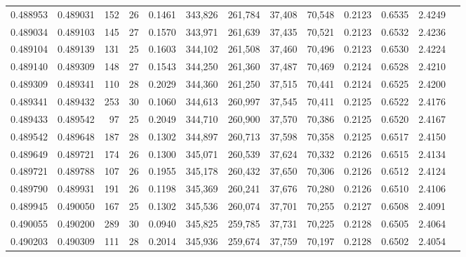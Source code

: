 \begin{tabular}{rrrrrrrrrrrrr}
0.488953 & 0.489031 & 152 &  26 &                                     0.1461 & 343,826 & 261,784 &  37,408 &  70,548 & 0.2123 & 0.6535 & 2.4249 \\
0.489034 & 0.489103 & 145 &  27 &                                     0.1570 & 343,971 & 261,639 &  37,435 &  70,521 & 0.2123 & 0.6532 & 2.4236 \\
0.489104 & 0.489139 & 131 &  25 &                                     0.1603 & 344,102 & 261,508 &  37,460 &  70,496 & 0.2123 & 0.6530 & 2.4224 \\
0.489140 & 0.489309 & 148 &  27 &                                     0.1543 & 344,250 & 261,360 &  37,487 &  70,469 & 0.2124 & 0.6528 & 2.4210 \\
0.489309 & 0.489341 & 110 &  28 &                                     0.2029 & 344,360 & 261,250 &  37,515 &  70,441 & 0.2124 & 0.6525 & 2.4200 \\
0.489341 & 0.489432 & 253 &  30 &                                     0.1060 & 344,613 & 260,997 &  37,545 &  70,411 & 0.2125 & 0.6522 & 2.4176 \\
0.489433 & 0.489542 &  97 &  25 &                                     0.2049 & 344,710 & 260,900 &  37,570 &  70,386 & 0.2125 & 0.6520 & 2.4167 \\
0.489542 & 0.489648 & 187 &  28 &                                     0.1302 & 344,897 & 260,713 &  37,598 &  70,358 & 0.2125 & 0.6517 & 2.4150 \\
0.489649 & 0.489721 & 174 &  26 &                                     0.1300 & 345,071 & 260,539 &  37,624 &  70,332 & 0.2126 & 0.6515 & 2.4134 \\
0.489721 & 0.489788 & 107 &  26 &                                     0.1955 & 345,178 & 260,432 &  37,650 &  70,306 & 0.2126 & 0.6512 & 2.4124 \\
0.489790 & 0.489931 & 191 &  26 &                                     0.1198 & 345,369 & 260,241 &  37,676 &  70,280 & 0.2126 & 0.6510 & 2.4106 \\
0.489945 & 0.490050 & 167 &  25 &                                     0.1302 & 345,536 & 260,074 &  37,701 &  70,255 & 0.2127 & 0.6508 & 2.4091 \\
0.490055 & 0.490200 & 289 &  30 &                                     0.0940 & 345,825 & 259,785 &  37,731 &  70,225 & 0.2128 & 0.6505 & 2.4064 \\
0.490203 & 0.490309 & 111 &  28 &                                     0.2014 & 345,936 & 259,674 &  37,759 &  70,197 & 0.2128 & 0.6502 & 2.4054 \\

\end{tabular}
